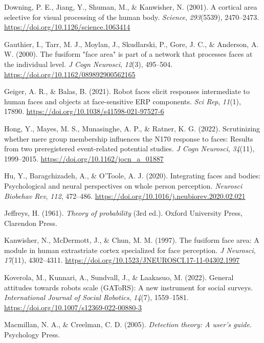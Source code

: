 \documentclass[
]{article}
\newlength{\cslhangindent}
\newenvironment{CSLReferences}[2] %
 {\begin{list}{}{%
  \setlength{\itemindent}{0pt}
  \setlength{\leftmargin}{0pt}
  \setlength{\parsep}{0pt}
  \ifodd #1
   \setlength{\leftmargin}{\cslhangindent}
   \setlength{\itemindent}{-1\cslhangindent}
  \fi
  \setlength{\itemsep}{#2\baselineskip}}}
 {\end{list}}
\begin{document}
\begin{CSLReferences}{1}{0}
Downing, P. E., Jiang, Y., Shuman, M., \& Kanwisher, N. (2001). A cortical area selective for visual processing of the human body. \emph{Science}, \emph{293}(5539), 2470--2473. \url{https://doi.org/10.1126/science.1063414}

Gauthier, I., Tarr, M. J., Moylan, J., Skudlarski, P., Gore, J. C., \& Anderson, A. W. (2000). The fusiform "face area" is part of a network that processes faces at the individual level. \emph{J Cogn Neurosci}, \emph{12}(3), 495--504. \url{https://doi.org/10.1162/089892900562165}

Geiger, A. R., \& Balas, B. (2021). Robot faces elicit responses intermediate to human faces and objects at face-sensitive ERP components. \emph{Sci Rep}, \emph{11}(1), 17890. \url{https://doi.org/10.1038/s41598-021-97527-6}

Hong, Y., Mayes, M. S., Munasinghe, A. P., \& Ratner, K. G. (2022). Scrutinizing whether mere group membership influences the N170 response to faces: Results from two preregistered event-related potential studies. \emph{J Cogn Neurosci}, \emph{34}(11), 1999--2015. \url{https://doi.org/10.1162/jocn_a_01887}

Hu, Y., Baragchizadeh, A., \& O'Toole, A. J. (2020). Integrating faces and bodies: Psychological and neural perspectives on whole person perception. \emph{Neurosci Biobehav Rev}, \emph{112}, 472--486. \url{https://doi.org/10.1016/j.neubiorev.2020.02.021}

Jeffreys, H. (1961). \emph{Theory of probability} (3rd ed.). Oxford University Press, Clarendon Press.

Kanwisher, N., McDermott, J., \& Chun, M. M. (1997). The fusiform face area: A module in human extrastriate cortex specialized for face perception. \emph{J Neurosci}, \emph{17}(11), 4302--4311. \url{https://doi.org/10.1523/JNEUROSCI.17-11-04302.1997}

Koverola, M., Kunnari, A., Sundvall, J., \& Laakasuo, M. (2022). General attitudes towards robots scale (GAToRS): A new instrument for social surveys. \emph{International Journal of Social Robotics}, \emph{14}(7), 1559--1581. \url{https://doi.org/10.1007/s12369-022-00880-3}

Macmillan, N. A., \& Creelman, C. D. (2005). \emph{Detection theory: A user's guide}. Psychology Press.


\end{CSLReferences}
\end{document}
